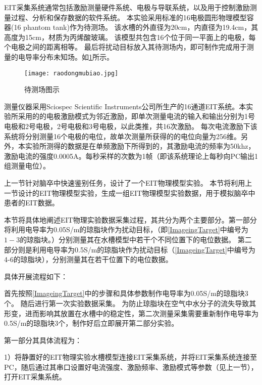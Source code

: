 EIT采集系统通常包括激励测量硬件系统、电极与导联系统，以及用于控制激励测量过程、分析和保存数据的软件系统。
本实验采用标准的16电极圆形物理模型容器(16 phantom tank)作为待测场。
该水槽的外直径为20cm，内直径为19.4cm，其高度为15cm，材质为丙烯酸玻璃。
该模型共包含16个位于同一平面上的电极，每个电极之间的距离相等。
最后将扰动目标放入其待测场内，即可制作完成用于测量的电导率分布未知场。如\cref{figure:raodongmubiao}所示。
\begin{figure}[H]
    \centering
    \texttt{[image: raodongmubiao.jpg]}
    \caption{待测场图示}
    \label{figure:raodongmubiao}
\end{figure}
测量仪器采用Sciospec Scientific Instruments公司所生产的16通道EIT系统。本实验所采用的的电极激励模式为邻近激励，即单次测量电流的输入和输出分别为1号电极和2号电极，2号电极和3号电极，以此类推，共16次激励。
每次电流激励下该系统将分别测量16个电极的电位，故单次测量所获得的的电位向量为256维。另外，本实验所测得的数据是在单频激励下所得到的，其激励电流的频率为50khz，
激励电流的强度0.0005A。每秒采样的次数为1帧（即该系统理论上每秒向PC输出1组测量电位）。




上一节针对脑卒中快速鉴别任务，设计了一个EIT物理模型实验。
本节将利用上一节设计的EIT物理模型实验，生成一组EIT物理模型实验数据，用于模拟脑卒中患者的EIT数据。



本节将具体地阐述EIT物理实验数据采集过程，其共分为两个主要部分。第一部分将利用电导率为0.05S/m的琼脂块作为扰动目标，（即\cref{ImageingTarget}中编号为$1-3$的琼脂块。）分别测量其在水槽模型中若干个不同位置下的电位数据。
第二部分则是利用电导率为0.5S/m的琼脂块作为扰动目标（\cref{ImageingTarget}中编号为4-6的琼脂块），分别测量其在若干位置下的电位数据。

具体开展流程如下：

首先按照\cref{ImageingTarget}中的步骤和具体参数制作电导率为0.05S/m的琼脂块3个。
随后进行第一次实验数据采集。
为防止琼脂块在空气中水分子的流失导致其形变，进而影响其放置在水槽中的稳定性，第二次测量采集需要重新制作电导率为0.5S/m的琼脂块3个，制作好后立即展开第二部分实验。

第一部分其具体流程为：

     1）将静置好的EIT物理实验水槽模型连接EIT采集系统，并将EIT采集系统连接至PC，随后通过其串口设置好电流强度、激励频率、激励模式等参数（见上一节），打开EIT采集系统。

